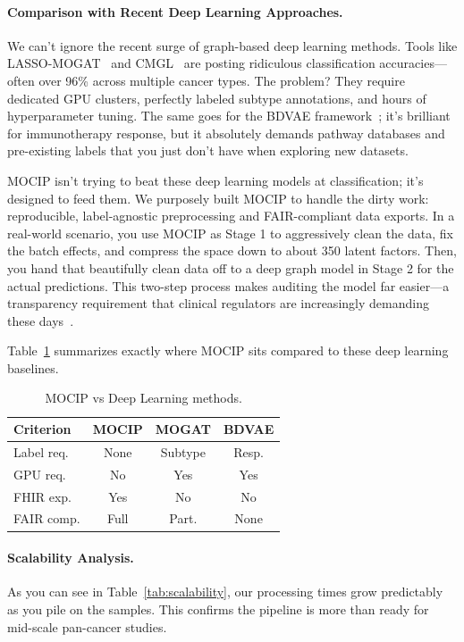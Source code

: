 \documentclass[runningheads]{llncs}
\begin{document}
\paragraph{Comparison with Recent Deep Learning Approaches.}
We can't ignore the recent surge of graph-based deep learning methods. Tools like LASSO-MOGAT~\cite{alharbi2024lassomogat} and CMGL~\cite{fan2026cmgl} are posting ridiculous classification accuracies---often over 96\% across multiple cancer types. The problem? They require dedicated GPU clusters, perfectly labeled subtype annotations, and hours of hyperparameter tuning. The same goes for the BDVAE framework~\cite{tariq2025bdvae}; it's brilliant for immunotherapy response, but it absolutely demands pathway databases and pre-existing labels that you just don't have when exploring new datasets.

MOCIP isn't trying to beat these deep learning models at classification; it's designed to feed them. We purposely built MOCIP to handle the dirty work: reproducible, label-agnostic preprocessing and FAIR-compliant data exports. In a real-world scenario, you use MOCIP as Stage 1 to aggressively clean the data, fix the batch effects, and compress the space down to about 350 latent factors. Then, you hand that beautifully clean data off to a deep graph model in Stage 2 for the actual predictions. This two-step process makes auditing the model far easier---a transparency requirement that clinical regulators are increasingly demanding these days~\cite{muneer2025review}.

Table~\ref{tab:comparison_dl} summarizes exactly where MOCIP sits compared to these deep learning baselines.

\begin{table}[H]
\caption{MOCIP vs Deep Learning methods.}\label{tab:comparison_dl}
\centering
\scriptsize
\setlength{\tabcolsep}{2pt}
\begin{tabular}{l c c c}
\toprule
\textbf{Criterion} & \textbf{MOCIP} & \textbf{MOGAT} & \textbf{BDVAE} \\
\midrule
Label req.  & None  & Subtype & Resp. \\
GPU req.    & No    & Yes     & Yes \\
FHIR exp.   & Yes   & No      & No \\
FAIR comp.  & Full  & Part.   & None \\
\bottomrule
\end{tabular}
\end{table}

\paragraph{Scalability Analysis.}
As you can see in Table~\ref{tab:scalability}, our processing times grow predictably as you pile on the samples. This confirms the pipeline is more than ready for mid-scale pan-cancer studies.
\end{document}
